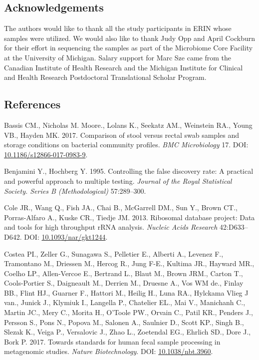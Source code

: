 \documentclass[12pt,]{article}
\begin{document}
\subsection{Acknowledgements}\label{acknowledgements}

The authors would like to thank all the study participants in ERIN whose
samples were utilized. We would also like to thank Judy Opp and April
Cockburn for their effort in sequencing the samples as part of the
Microbiome Core Facility at the University of Michigan. Salary support
for Marc Sze came from the Canadian Institute of Health Research and the
Michigan Institute for Clinical and Health Research Postdoctoral
Translational Scholar Program.

\newpage

\subsection{References}\label{references}

\hypertarget{refs}{}
\hypertarget{ref-storage_Bassis_2017}{}
Bassis CM., Nicholas M. Moore., Lolans K., Seekatz AM., Weinstein RA.,
Young VB., Hayden MK. 2017. Comparison of stool versus rectal swab
samples and storage conditions on bacterial community profiles.
\emph{BMC Microbiology} 17. DOI:
\href{https://doi.org/10.1186/s12866-017-0983-9}{10.1186/s12866-017-0983-9}.

\hypertarget{ref-benjamini_controlling_1995}{}
Benjamini Y., Hochberg Y. 1995. Controlling the false discovery rate: A
practical and powerful approach to multiple testing. \emph{Journal of
the Royal Statistical Society. Series B (Methodological)} 57:289--300.

\hypertarget{ref-rdp_Cole_2013}{}
Cole JR., Wang Q., Fish JA., Chai B., McGarrell DM., Sun Y., Brown CT.,
Porras-Alfaro A., Kuske CR., Tiedje JM. 2013. Ribosomal database
project: Data and tools for high throughput rRNA analysis. \emph{Nucleic
Acids Research} 42:D633--D642. DOI:
\href{https://doi.org/10.1093/nar/gkt1244}{10.1093/nar/gkt1244}.

\hypertarget{ref-metagenomcis_bias_Costea_2017}{}
Costea PI., Zeller G., Sunagawa S., Pelletier E., Alberti A., Levenez
F., Tramontano M., Driessen M., Hercog R., Jung F-E., Kultima JR.,
Hayward MR., Coelho LP., Allen-Vercoe E., Bertrand L., Blaut M., Brown
JRM., Carton T., Cools-Portier S., Daigneault M., Derrien M., Druesne
A., Vos WM de., Finlay BB., Flint HJ., Guarner F., Hattori M., Heilig
H., Luna RA., Hylckama Vlieg J van., Junick J., Klymiuk I., Langella P.,
Chatelier EL., Mai V., Manichanh C., Martin JC., Mery C., Morita H.,
O'Toole PW., Orvain C., Patil KR., Penders J., Persson S., Pons N.,
Popova M., Salonen A., Saulnier D., Scott KP., Singh B., Slezak K.,
Veiga P., Versalovic J., Zhao L., Zoetendal EG., Ehrlich SD., Dore J.,
Bork P. 2017. Towards standards for human fecal sample processing in
metagenomic studies. \emph{Nature Biotechnology}. DOI:
\href{https://doi.org/10.1038/nbt.3960}{10.1038/nbt.3960}.
\end{document}
